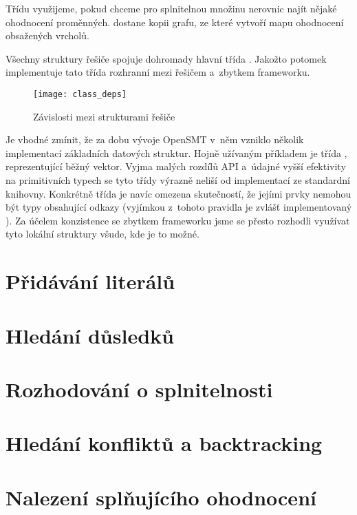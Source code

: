 Třídu  využijeme, pokud chceme pro splnitelnou množinu nerovnic najít nějaké ohodnocení proměnných.  dostane kopii grafu, ze které vytvoří mapu ohodnocení obsažených vrcholů.

Všechny struktury řešiče spojuje dohromady hlavní třída . Jakožto potomek  implementuje tato třída rozhranní mezi řešičem a~zbytkem frameworku. %

\begin{figure}
	\centering
	\texttt{[image: class\_deps]}
	\caption{Závislosti mezi strukturami řešiče}
\end{figure}

Je vhodné zmínit, že za dobu vývoje OpenSMT v~něm vzniklo několik implementací základních datových struktur. Hojně užívaným příkladem je třída , reprezentující běžný vektor. Vyjma malých rozdílů API a~údajné vyšší efektivity na primitivních typech se tyto třídy výrazně neliší od implementací ze standardní knihovny. Konkrétně třída  je navíc omezena skutečností, že jejími prvky nemohou být typy obsahující odkazy (vyjímkou z~tohoto pravidla je zvlášť implementovaný ). Za účelem konzistence se zbytkem frameworku jsme se přesto rozhodli využívat tyto lokální struktury všude, kde je to možné. 


\section{Přidávání literálů}\label{add}

\section{Hledání důsledků}\label{dusl}

\section{Rozhodování o splnitelnosti}

\section{Hledání konfliktů a backtracking}

\section{Nalezení splňujícího ohodnocení}
